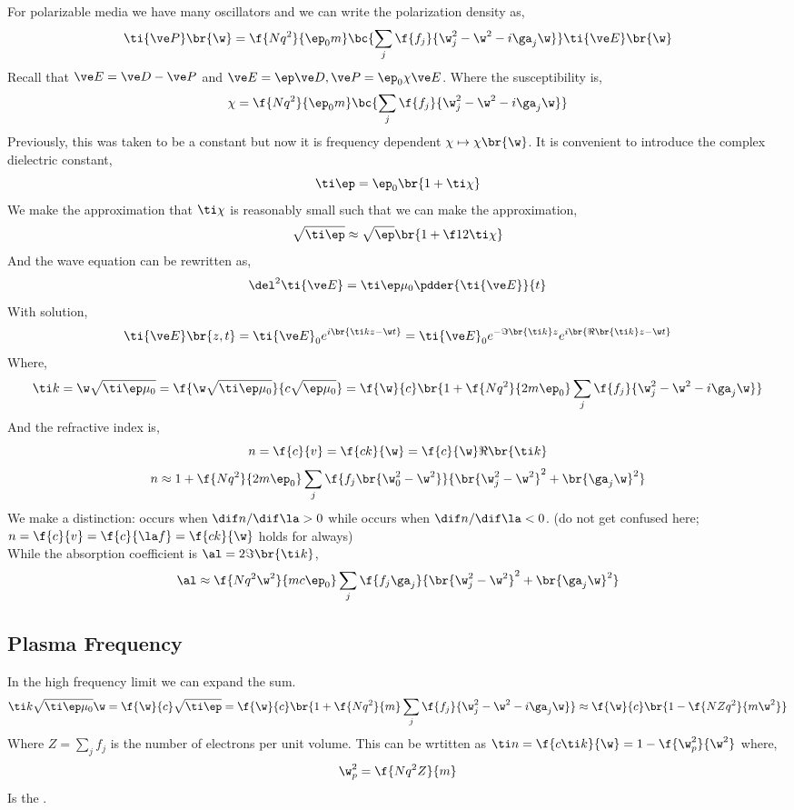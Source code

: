 \documentclass{article}
\begin{document}
For polarizable media we have many oscillators and we can write the polarization density as,
\[ \ti{\ve P}\br{\w} = \f{N q^2}{\ep_0 m} \bc{\sum_{j} \f{f_j}{\w_j^2 - \w^2 - i \ga_j \w}} \ti{\ve E}\br{\w} \]
Recall that $\ve E = \ve D - \ve P$ and $\ve E = \ep \ve D, \ve P = \ep_0 \chi \ve E$. Where the susceptibility is,
\[ \chi = \f{N q^2}{\ep_0 m} \bc{\sum_{j} \f{f_j}{\w_j^2 - \w^2 - i \ga_j \w}} \]
Previously, this was taken to be a constant but now it is frequency dependent $\chi \mapsto \chi\br{\w}$. It is convenient to introduce the complex dielectric constant,
\[ \ti \ep = \ep_0 \br{1 + \ti \chi} \]
We make the approximation that $\ti \chi$ is reasonably small such that we can make the approximation,
\[ \sqrt{\ti \ep} \approx \sqrt{\ep} \br{1 + \f12 \ti \chi} \]
And the wave equation can be rewritten as,
\[ \del^2 \ti{\ve E} = \ti \ep \mu_0 \pdder{\ti{\ve E}}{t} \]
With solution,
\[ \ti{\ve E}\br{z, t} = \ti{\ve E}_0 e^{i\br{\ti k z - \w t}} = \ti{\ve E}_0 e^{- \Im\br{\ti k} z} e^{i\br{\Re\br{\ti k} z - \w t}} \]
Where,
\[ \ti k = \w \sqrt{\ti \ep \mu_0} = \f{\w \sqrt{\ti \ep \mu_0}}{c \sqrt{\ep \mu_0}} = \f{\w}{c}\br{1 + \f{N q^2}{2 m \ep_0} \sum_j \f{f_j}{\w_j^2 - \w^2 - i \ga_j \w}} \]
And the refractive index is,
\[ n = \f{c}{v} = \f{ck}{\w} = \f{c}{\w} \Re\br{\ti k} \]
\[ n \approx 1 + \f{N q^2}{2 m \ep_0} \sum_j \f{f_j\br{\w_0^2 - \w^2}}{\br{\w_j^2 - \w^2}^2 + \br{\ga_j \w}^2} \]
We make a distinction:  occurs when $\dif n / \dif \la > 0$ while  occurs when $\dif n / \dif \la < 0$. (do not get confused here; $n = \f{c}{v} = \f{c}{\la f} = \f{c k}{\w}$ holds for always)\\
While the absorption coefficient is $\al = 2 \Im\br{\ti k}$,
\[ \al \approx \f{N q^2 \w^2 }{m c \ep_0} \sum_j \f{f_j \ga_j}{\br{\w_j^2 - \w^2}^2 + \br{\ga_j \w}^2} \]
\subsection{Plasma Frequency}
In the high frequency limit we can expand the sum.
\[ \ti k \sqrt{\ti \ep \mu_0} \w = \f{\w}{c} \sqrt{\ti \ep} = \f{\w}{c} \br{1 + \f{N q^2}{m} \sum_j \f{f_j}{\w_j^2 - \w^2 - i \ga_j \w}} \approx \f{\w}{c}\br{1 - \f{NZ q^2}{m \w^2}} \]
Where $Z = \sum_j f_j$ is the number of electrons per unit volume. This can be wrtitten as $\ti n = \f{c \ti k}{\w} = 1 - \f{\w_p^2}{\w^2}$ where,
\[ \w_p^2 = \f{Nq^2 Z}{m} \]
Is the .

\end{document}

